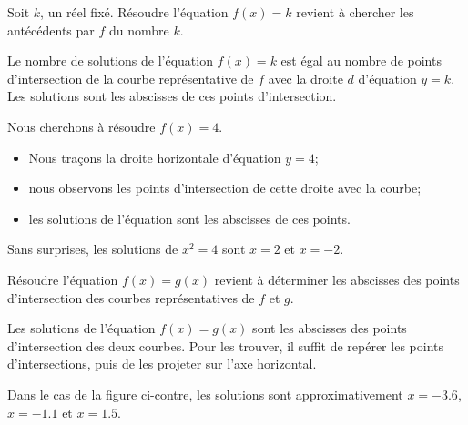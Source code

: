 \begin{Aretenir}
    Soit $k$, un réel fixé. Résoudre l'équation $f(x)=k$ revient à chercher les antécédents par $f$ du nombre $k$.

Le nombre de solutions de l'équation $f(x)=k$ est égal au nombre de points d'intersection de la courbe représentative de \( f\) avec la droite $d$ d'équation $y=k$. Les solutions sont les abscisses de ces points d'intersection. 
\end{Aretenir}


\begin{example}
    \begin{multicols}{2}
  Nous cherchons à résoudre $f(x)=4$. 
  \begin{itemize}
      \item 
          Nous traçons la droite horizontale d'équation \( y=4\);
      \item
          nous observons les points d'intersection de cette droite avec la courbe;
      \item
          les solutions de l'équation sont les abscisses de ces points.
  \end{itemize}

\columnbreak




    \end{multicols}

    Sans surprises, les solutions de \( x^2=4\) sont \( x=2\) et \( x=-2\).

\end{example}

\begin{Aretenir}
    Résoudre l'équation $f(x)=g(x)$ revient à déterminer les abscisses des points d'intersection des courbes représentatives de \( f\) et \( g\).
\end{Aretenir}


\begin{multicols}{2}

    Les solutions de l'équation \( f(x)=g(x)\) sont les abscisses des points d'intersection des deux courbes. Pour les trouver, il suffit de repérer les points d'intersections, puis de les projeter sur l'axe horizontal.

    Dans le cas de la figure ci-contre, les solutions sont approximativement \( x=-3.6\), \( x=-1.1\) et \( x=1.5\).

\columnbreak



\end{multicols}


